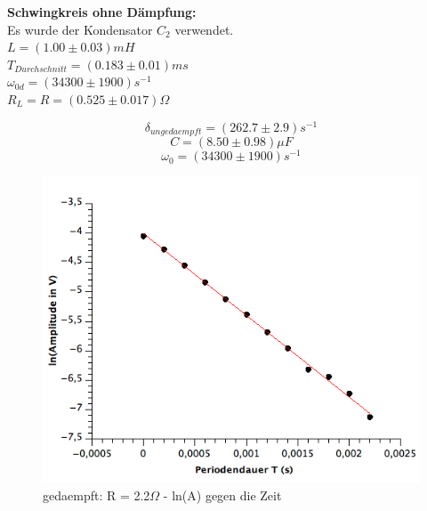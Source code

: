 \documentclass[12pt,a4paper]{article}
\begin{document}
\begin{multicols}{2}



\noindent \textbf{Schwingkreis ohne Dämpfung:}\\

\noindent Es wurde der Kondensator $C_2$ verwendet.\\

\noindent $L=(1.00 \pm 0.03)mH$\\
$T_{Durchschnitt}%
= (0.183 \pm 0.01)ms$\\
$\omega_{0d} = (34300 \pm 1900)s^{-1}$\\
$R_L = R = (0.525 \pm 0.017)\Omega$

$$\delta_{ungedaempft} = (262.7 \pm 2.9)s^{-1}$$
$$C = (8.50 \pm 0.98)\mu F$$
$$\omega_{0} = (34300\pm 1900)s^{-1}$$



\end{multicols}
\begin{figure}[H]
	\centering
	\includegraphics[scale=0.7]{./figure/Schwingkreis_mit2-2ohm-daempfung.png}
	\caption{gedaempft: R = 2.2$\Omega$ - ln(A) gegen die Zeit}
	\label{fig:schwingkreis_2ohmdaempfung}
\end{figure}
\end{document}
